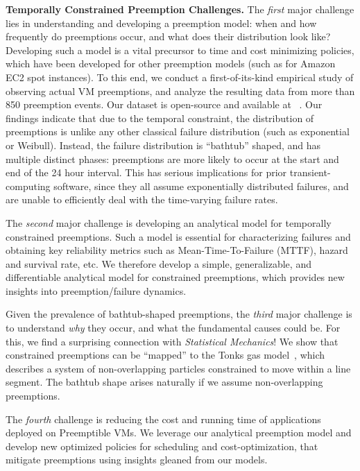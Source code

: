 \documentclass[compsoc]{IEEEtran}
\begin{document}
\noindent \textbf{Temporally Constrained Preemption Challenges.}
The \emph{first} major challenge lies in understanding and developing a preemption model: when and how frequently do preemptions occur, and what does their distribution look like?
Developing such a model is a vital precursor to time and cost minimizing policies, which have been developed for other preemption models (such as for Amazon EC2 spot instances). 
To this end, we conduct a first-of-its-kind empirical study of observing actual VM preemptions, and analyze the resulting data from more than 850 preemption events.
Our dataset is open-source and available at ~\cite{scispot-dataset}. 
Our findings indicate that due to the temporal constraint, the distribution of preemptions is unlike any other classical failure distribution (such as exponential or Weibull).
Instead, the failure distribution is ``bathtub'' shaped, and has multiple distinct phases: preemptions are more likely to occur at the start and end of the 24 hour interval. 
This has serious implications for prior transient-computing software, since they all assume exponentially distributed failures, and are unable to efficiently deal with the time-varying failure rates.

The \emph{second} major challenge is developing an analytical model for temporally constrained preemptions.
Such a model is essential for characterizing failures and obtaining key reliability metrics such as Mean-Time-To-Failure (MTTF), hazard and survival rate, etc.
We therefore develop a simple, generalizable, and differentiable analytical model for constrained preemptions, which provides new insights into preemption/failure dynamics.

Given the prevalence of bathtub-shaped preemptions, the \emph{third} major challenge is to understand \emph{why} they occur, and what the fundamental causes could be. 
For this, we find a surprising connection with \emph{Statistical Mechanics}!
We show that constrained preemptions can be ``mapped'' to the Tonks gas model~\cite{tonks, krauth2006statistical}, which describes a system of non-overlapping particles constrained to move within a line segment. The bathtub shape arises naturally if we assume non-overlapping preemptions. 

The \emph{fourth} challenge is reducing the cost and running time of applications deployed on Preemptible VMs.
We leverage our analytical preemption model and develop new optimized policies for scheduling and cost-optimization, that mitigate preemptions using insights gleaned from our models.
\end{document}

